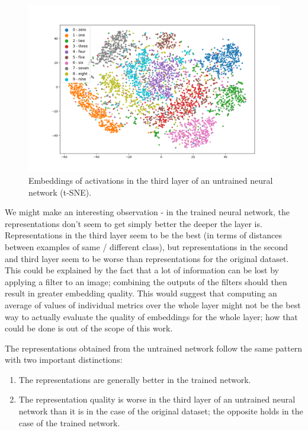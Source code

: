 \documentclass{article}
\begin{document}
\begin{figure}
  \centering
    \includegraphics[width=1.0\textwidth]{../../out/activations_cnn/mnist/t-sne/untrained/plot_l3.png}
    \caption{Embeddings of activations in the third layer of an untrained neural network (t-SNE).}
\end{figure}

We might make an interesting observation - in the trained neural network, the
representations don't seem to get simply better the deeper the layer is.
Representations in the third layer seem to be the best (in terms of distances
between examples of same / different class), but representations in the second
and third layer seem to be worse than representations for the original
dataset. This could be explained by the fact that a lot of information can
be lost by applying a filter to an image; combining the outputs of
the filters should then result in greater embedding quality. This would
suggest that computing an average of values of individual metrics over
the whole layer might not be the best way to actually evaluate the
quality of embeddings for the whole layer; how that could be done is
out of the scope of this work.

The representations obtained from the untrained network follow the same
pattern with two important distinctions:
\begin{enumerate}
  \item The representations are generally better in the trained network.
  \item The representation quality is worse in the third layer of an
      untrained neural network than it is in the case of the original
      dataset; the opposite holds in the case of the trained network.
\end{enumerate}
\end{document}
